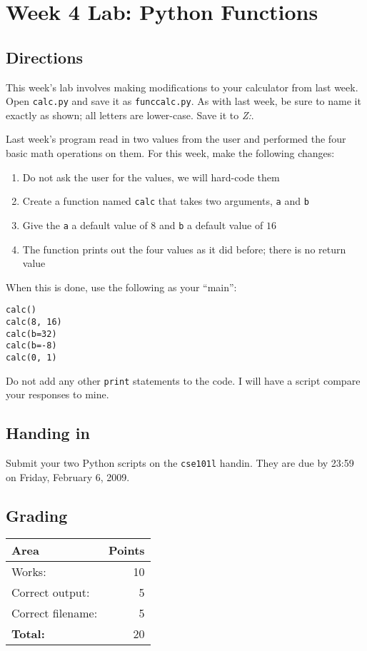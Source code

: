 \documentclass[11pt, letterpaper]{article}
\begin{document}
\section*{Week 4 Lab: Python Functions}

\subsection*{Directions}

This week's lab involves making modifications to your calculator from last week. Open {\tt calc.py} and save it as {\tt funccalc.py}. As with last week, be sure to name it exactly as shown; all letters are lower-case. Save it to {\em Z:}.

Last week's program read in two values from the user and performed the four basic math operations on them. For this week, make the following changes:

\begin{enumerate}
	\item Do not ask the user for the values, we will hard-code them
	\item Create a function named {\tt calc} that takes two arguments, {\tt a} and {\tt b}
	\item Give the {\tt a} a default value of $8$ and {\tt b} a default value of $16$
	\item The function prints out the four values as it did before; there is no return value
\end{enumerate}

When this is done, use the following as your ``main'':

\begin{lstlisting}
calc()
calc(8, 16)
calc(b=32)
calc(b=-8)
calc(0, 1)
\end{lstlisting}

Do not add any other {\tt print} statements to the code. I will have a script compare your responses to mine.

\subsection*{Handing in}

Submit your two Python scripts on the {\tt cse101l} handin. They are due by 23:59 on Friday, February 6, 2009.

\subsection*{Grading}

\begin{tabular}{lr}
	Area & Points\\
	\hline
	Works: & 10\\
	Correct output: & 5\\
	Correct filename: & 5\\
	{\bf Total:} & 20
\end{tabular}
\end{document}

